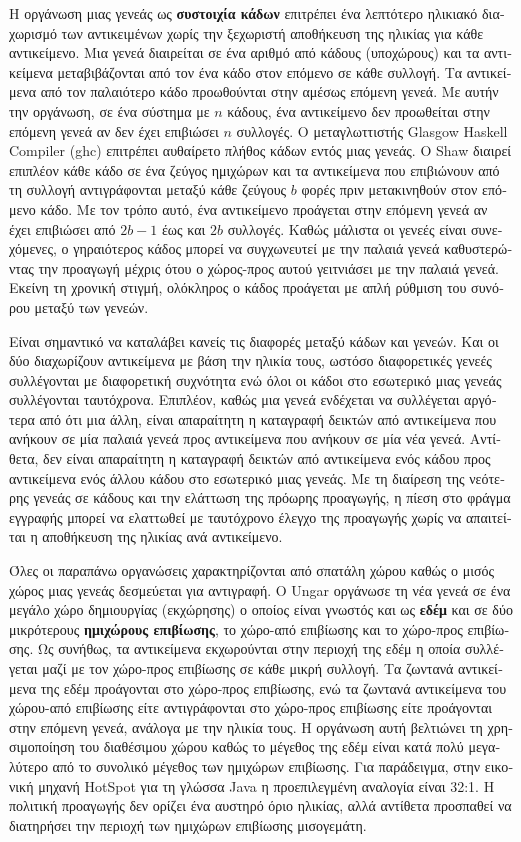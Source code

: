 \begin{greek}
Η οργάνωση μιας γενεάς ως \textbf{συστοιχία κάδων} επιτρέπει ένα
λεπτότερο ηλικιακό διαχωρισμό των αντικειμένων χωρίς την ξεχωριστή αποθήκευση της
ηλικίας για κάθε αντικείμενο. Μια γενεά διαιρείται σε ένα αριθμό από κάδους
(υποχώρους) και τα αντικείμενα μεταβιβάζονται από τον ένα κάδο στον επόμενο σε
κάθε συλλογή. Τα αντικείμενα από τον παλαιότερο κάδο προωθούνται στην αμέσως επόμενη
γενεά. Με αυτήν την οργάνωση, σε ένα σύστημα με $n$ κάδους, ένα αντικείμενο δεν
προωθείται στην επόμενη γενεά αν δεν έχει επιβιώσει $n$ συλλογές. Ο μεταγλωττιστής
Glasgow Haskell Compiler (ghc) επιτρέπει αυθαίρετο πλήθος κάδων εντός μιας γενεάς.
Ο Shaw \cite{Shaw:1988:EAL:59942} διαιρεί επιπλέον κάθε κάδο σε
ένα ζεύγος ημιχώρων και τα αντικείμενα που επιβιώνουν από τη
συλλογή αντιγράφονται μεταξύ κάθε ζεύγους $b$ φορές πριν
μετακινηθούν στον επόμενο κάδο. Με τον τρόπο αυτό, ένα αντικείμενο
προάγεται στην επόμενη γενεά αν έχει επιβιώσει από $2b-1$ έως
και $2b$ συλλογές. Καθώς μάλιστα οι γενεές είναι συνεχόμενες,
ο γηραιότερος κάδος μπορεί να συγχωνευτεί με την παλαιά γενεά
καθυστερώντας την προαγωγή μέχρις ότου ο χώρος-προς αυτού
γειτνιάσει με την παλαιά γενεά. Εκείνη τη χρονική στιγμή, ολόκληρος
ο κάδος προάγεται με απλή ρύθμιση του συνόρου μεταξύ των γενεών.

Είναι σημαντικό να καταλάβει κανείς τις διαφορές μεταξύ κάδων
και γενεών. Και οι δύο διαχωρίζουν αντικείμενα με βάση την
ηλικία τους, ωστόσο διαφορετικές γενεές συλλέγονται με
διαφορετική συχνότητα ενώ όλοι οι κάδοι στο εσωτερικό μιας
γενεάς συλλέγονται ταυτόχρονα. Επιπλέον, καθώς μια γενεά
ενδέχεται να συλλέγεται αργότερα από ότι μια άλλη, είναι
απαραίτητη η καταγραφή δεικτών από αντικείμενα που ανήκουν
σε μία παλαιά γενεά προς αντικείμενα που ανήκουν σε μία νέα
γενεά. Αντίθετα, δεν είναι απαραίτητη η καταγραφή δεικτών
από αντικείμενα ενός κάδου προς αντικείμενα ενός άλλου κάδου
στο εσωτερικό μιας γενεάς. Με τη διαίρεση της νεότερης γενεάς
σε κάδους και την ελάττωση της πρόωρης προαγωγής, η πίεση στο
φράγμα εγγραφής μπορεί να ελαττωθεί με ταυτόχρονο έλεγχο της
προαγωγής χωρίς να απαιτείται η αποθήκευση της ηλικίας ανά
αντικείμενο.

Όλες οι παραπάνω οργανώσεις χαρακτηρίζονται από σπατάλη χώρου
καθώς ο μισός χώρος μιας γενεάς δεσμεύεται για αντιγραφή. Ο
Ungar \cite{Ungar:CSD-86-287} οργάνωσε τη νέα γενεά σε ένα
μεγάλο χώρο δημιουργίας (εκχώρησης) ο οποίος είναι γνωστός
και ως \textbf{εδέμ} και σε δύο μικρότερους \textbf{ημιχώρους επιβίωσης},
το χώρο-από επιβίωσης και το χώρο-προς επιβίωσης.
Ως συνήθως, τα αντικείμενα εκχωρούνται στην περιοχή της εδέμ
η οποία συλλέγεται μαζί με τον χώρο-προς επιβίωσης σε κάθε
μικρή συλλογή. Τα ζωντανά αντικείμενα της εδέμ προάγονται
στο χώρο-προς επιβίωσης, ενώ τα ζωντανά αντικείμενα του
χώρου-από επιβίωσης είτε αντιγράφονται στο χώρο-προς επιβίωσης
είτε προάγονται στην επόμενη γενεά, ανάλογα με την ηλικία τους.
Η οργάνωση αυτή βελτιώνει τη χρησιμοποίηση του διαθέσιμου
χώρου καθώς το μέγεθος της εδέμ είναι κατά πολύ μεγαλύτερο
από το συνολικό μέγεθος των ημιχώρων επιβίωσης. Για παράδειγμα,
στην εικονική μηχανή HotSpot για τη γλώσσα Java η προεπιλεγμένη
αναλογία είναι 32:1. Η πολιτική προαγωγής δεν ορίζει ένα αυστηρό
όριο ηλικίας, αλλά αντίθετα προσπαθεί να διατηρήσει την περιοχή
των ημιχώρων επιβίωσης μισογεμάτη.


\end{greek}
